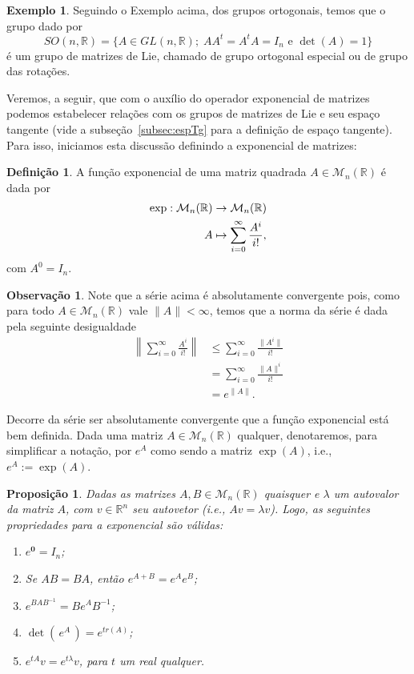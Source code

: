 \documentclass[twoside,openright,titlepage,numbers=noenddot,headinclude,  lineheaders footinclude=true,cleardoublepage=empty,
                                BCOR=5mm,paper=a4,fontsize=12pt ]{scrbook}
\newtheorem{prop}[teo]{Proposição}
\theoremstyle{definition}
\newtheorem{definicao}{Definição}[chapter]
\newtheorem{exmp}{Exemplo}[section]
\newtheorem*{obs*}{Observação}
\begin{document}
\begin{exmp}
Seguindo o Exemplo acima, dos grupos ortogonais, temos que o grupo dado por
\[
SO(n, \mathbb{R}) = \{ A \in GL(n, \mathbb{R}); \; AA^t = A^tA = I_n \text{ e } \det(A) = 1  \} 
\]
é um grupo de matrizes de Lie, chamado de grupo ortogonal especial ou de grupo das rotações.
\end{exmp}

Veremos, a seguir, que com o auxílio do operador exponencial de matrizes podemos estabelecer relações com
os grupos de matrizes de Lie e seu espaço tangente (vide a subseção~\ref{subsec:espTg} para a definição de espaço
tangente). Para isso, iniciamos esta discussão definindo a exponencial de matrizes:

\begin{definicao}
A função exponencial de uma matriz quadrada $A \in \mathcal{M}_n( \mathbb{R} ) $ é dada por
\begin{align*}
\exp: \mathcal{M}_n( \mathbb{R} ) & \rightarrow \mathcal{M}_n( \mathbb{R} )\\
A & \mapsto \sum_{i=0}^{\infty} \frac{A^i}{i!}, \index{exponencial de uma matriz}
\end{align*} 
com $A^0 = I_n$. 
\end{definicao}

\begin{obs*}
Note que a série acima é absolutamente convergente pois, como para 
todo $A \in \mathcal{M}_n( \mathbb{R} )$ vale $\|A\| < \infty$,
temos que a norma da série é dada  pela seguinte desigualdade
\begin{align*}
 \left\|\sum_{i=0}^{\infty} \frac{A^i}{i!}\right\| &\leq \sum_{i=0}^{\infty} \frac{\|A^i\|}{i!}\\
					& = \sum_{i=0}^{\infty} \frac{\|A\|^i}{i!}\\
					& = e^{\|A\|}.
\end{align*}
\end{obs*}


Decorre da série ser absolutamente convergente que a função exponencial está bem definida.
Dada uma matriz $A \in \mathcal{M}_n( \mathbb{R} )$ qualquer, denotaremos, para simplificar a notação, por $e^A$
como sendo a matriz $\exp(A)$, i.e., $e^A := \exp(A)$.

\begin{prop}
Dadas as matrizes $A, B \in \mathcal{M}_n( \mathbb{R} )$ quaisquer
e $\lambda$ um autovalor da matriz $A$, com $v \in \mathbb{R}^n$ seu autovetor 
(i.e., $Av = \lambda v$).
Logo,  as seguintes propriedades para a exponencial são válidas:
\begin{enumerate}[P1)]
	\item $e^{\mathbf{0}} = I_n$;
	\item Se $AB = BA$, então $ e^{A + B} = e^A e^B$;
	\item $e^{BAB^{-1}} = B e^{A} B^{-1}$; 
	\item $ \det( \,e^{A} \, ) = e^{tr(A)}$; \label{detTr}
	\item $e^{t A}v = e^{t \lambda}v$, para $t$ um real qualquer. \label{expEig}
\end{enumerate}
\end{prop}
\end{document}
